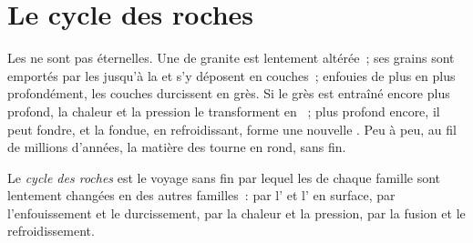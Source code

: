 \section{Le cycle des roches}

Les  ne sont pas éternelles. Une  de granite est lentement
altérée~; ses grains sont emportés par les  jusqu'à la  et s'y
déposent en couches~; enfouies de plus en plus profondément, les couches
durcissent en grès. Si le grès est entraîné encore plus profond, la
chaleur et la pression le transforment en ~; plus
profond encore, il peut fondre, et la  fondue, en refroidissant,
forme une nouvelle . Peu à peu, au fil de millions d'années, la
matière des  tourne en rond, sans fin.

\begin{definition}\label{def:g6:rocks-and-minerals:rock-cycle}
Le \emph{cycle des roches} est le voyage sans fin
par lequel les  de chaque famille sont lentement changées en 
des autres familles~: par l' et l' en surface, par
l'enfouissement et le durcissement, par la chaleur et la pression, par la
fusion et le refroidissement.
\end{definition}

